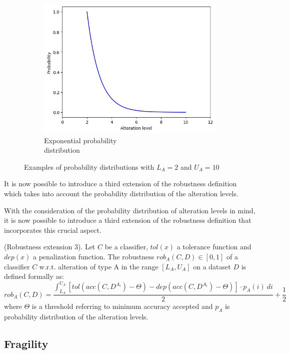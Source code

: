 \begin{figure}[h]
\begin{subfigure}{.33\textwidth}
		\includegraphics[width=0.9\linewidth]{ImageFiles/ANNRob/exp_prob}
		\caption{Exponential probability \\ distribution}
		\label{fig:exp_prob}
	\end{subfigure}
	\caption{Examples of probability distributions with $L_A=2$ and $U_A=10$}
	\label{fig:prob_examp}
\end{figure}

It is now possible to introduce a third extension of the robustness definition which takes into account the probability distribution of the alteration levels. 

With the consideration of the probability distribution of alteration levels in mind, it is now possible to introduce a third extension of the robustness definition that incorporates this crucial aspect.

\begin{definition}\label{def:rob3} (Robustness extension 3).
	Let $C$ be a classifier, $tol(x)$ a tolerance function and $dep(x)$ a penalization function.
	The robustness $rob_A(C,D) \in [0,1]$ of a classifier $C$ w.r.t. alteration of type A in the range $[L_A, U_A]$ on a dataset $D$ is defined formally as:
	\[
	rob_A(C,D) = \frac{\int_{L_A}^{U_A} [tol(acc(C,D^{A_i}) - \Theta) - dep(acc(C,D^{A_i}) - \Theta)] \cdot p_A(i)\ di}{2} + \frac{1}{2}
	\]
	where $\Theta$ is a threshold referring to minimum accuracy accepted and $p_A$ is probability distribution of the alteration levels.
\end{definition}


\subsection{Fragility}

